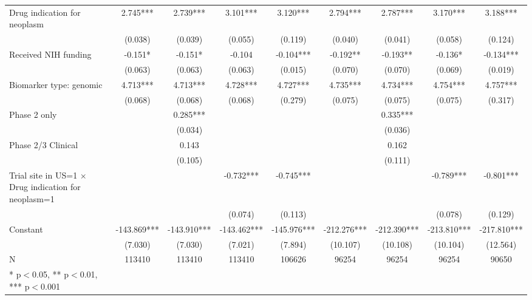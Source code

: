 \begin{table}[htb]
\begin{tabular}{l*{8}c}
Drug indication for neoplasm&       2.745***&       2.739***  &       3.101***&       3.120***&         2.794***&       2.787*** &       3.170***&       3.188*** \\
                    &     (0.038)   &     (0.039)   &     (0.055)   &     (0.119)   &      (0.040)   &     (0.041)   &     (0.058)   &     (0.124)   \\
Received NIH funding&      -0.151*  &      -0.151*  &      -0.104   &      -0.104***&      -0.192** &      -0.193** &      -0.136*  &      -0.134***\\
                    &     (0.063)   &     (0.063)   &     (0.063)   &     (0.015)   &     (0.070)   &     (0.070)   &     (0.069)   &     (0.019)   \\
Biomarker type: genomic&       4.713***&       4.713***&       4.728***&       4.727***&       4.735***&       4.734***&       4.754***&       4.757***\\
                    &     (0.068)   &     (0.068)   &     (0.068)   &     (0.279)   &     (0.075)   &     (0.075)   &     (0.075)   &     (0.317)   \\
Phase 2 only        &               &       0.285***&               &               &               &       0.335***&               &               \\
                    &               &     (0.034)   &               &               &               &     (0.036)   &               &               \\
Phase 2/3 Clinical  &               &       0.143   &               &               &               &       0.162   &               &               \\
                    &               &     (0.105)   &               &               &               &     (0.111)   &               &               \\
\shortstack[l]{Trial site in US=1\\$\times$ Drug indication for neoplasm=1}&               &               &      -0.732***&      -0.745***&               &               &      -0.789***&      -0.801***\\
                    &               &               &     (0.074)   &     (0.113)   &               &               &     (0.078)   &     (0.129)   \\
Constant            &    -143.869***&    -143.910***&    -143.462***&    -145.976***&    -212.276***&    -212.390***&    -213.810***&    -217.810***\\
                    &     (7.030)   &     (7.030)   &     (7.021)   &     (7.894)   &    (10.107)   &    (10.108)   &    (10.104)   &    (12.564)   \\
N                   &      113410   &      113410   &      113410   &      106626   &       96254   &       96254   &       96254   &       90650   \\
* p$<$0.05, ** p$<$0.01, *** p$<$0.001 \\

\end{tabular}
\end{table}

